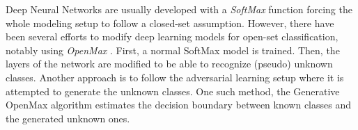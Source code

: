 


Deep Neural Networks are usually developed with a \textit{SoftMax} function forcing the whole modeling setup to follow a closed-set assumption. However, there have been several efforts to modify deep learning models for open-set classification, notably using \textit{OpenMax} \parencite{bendale2016towards,cardoso2017weightless}. First, a normal SoftMax model is trained. Then, the layers of the network are modified to be able to recognize (pseudo) unknown classes. Another approach is to follow the adversarial learning setup where it is attempted to generate the unknown classes. One such method, the Generative OpenMax algorithm \parencite{ge2017generative} estimates the decision boundary between known classes and the generated unknown ones.



